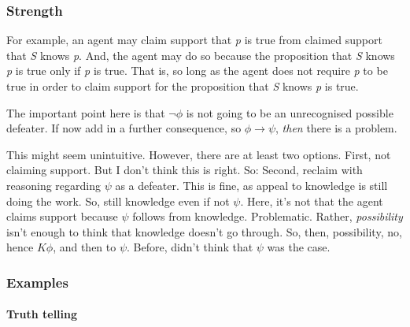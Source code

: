 \subsubsection{Strength}

\begin{note}
  For example, an agent may claim support that \emph{p} is true from claimed support that \emph{S} knows \emph{p}.
  And, the agent may do so because the proposition that \emph{S} knows \emph{p} is true only if \emph{p} is true.
  That is, so long as the agent does not require \emph{p} to be true in order to claim support for the proposition that \emph{S} knows \emph{p} is true.
  {
    \color{red}
    The important point here is that \(\lnot\phi\) is not going to be an unrecognised possible defeater.
    If now add in a further consequence, so \(\phi \rightarrow \psi\), \emph{then} there is a problem.

    This might seem unintuitive.
    However, there are at least two options.
    First, not claiming support.
    But I don't think this is right.
    So:
    Second, reclaim with reasoning regarding \(\psi\) as a defeater.
    This is fine, as appeal to knowledge is still doing the work.
    So, still knowledge even if not \(\psi\).
    Here, it's not that the agent claims support because \(\psi\) follows from knowledge.
    Problematic.
    Rather, \emph{possibility} isn't enough to think that knowledge doesn't go through.
    So, then, possibility, no, hence \(K\phi\), and then to \(\psi\).
    Before, didn't think that \(\psi\) was the case.
  }
\end{note}

\subsubsection{Examples}

\paragraph{Truth telling}

